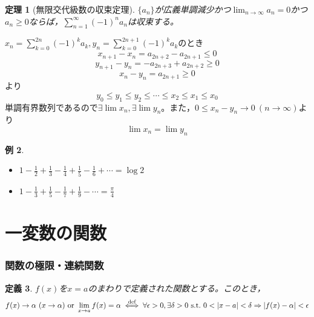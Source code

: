\documentclass[dvipdfmx,a4j,10pt]{jsarticle}
\makeatletter
\theoremstyle{mystyle1}
\newtheorem{dfn}{定義}[part]
\newtheorem{thm}[dfn]{定理}
\newtheorem{example}[dfn]{例}
\theoremstyle{mystyle2}
\renewenvironment{proof}[1][\proofname]{\par
  \pushQED{\qed}%
  \normalfont
  \topsep6\p@\@plus6\p@ \trivlist
  \item[\hskip\labelsep{\bfseries\sffamily #1}]\ignorespaces
}{%
  \popQED\endtrivlist\@endpefalse
}
\renewcommand\proofname{証明}
\newcommand{\defLeftrightarrow}{\overset{\text{def}}{\iff}}
\makeatother
\begin{document}
\newpage


\begin{framed}
    \begin{thm}[無限交代級数の収束定理]\label{thm4.10}
        $\{a_n\}$が広義単調減少かつ$\displaystyle\lim_{n\to\infty}a_n=0$かつ$a_n\geq0$ならば，$\displaystyle\sum_{n=1}^\infty (-1)^n a_n$は収束する。
    \end{thm}
\end{framed}

\begin{proof}[定理\ref{thm4.10}の証明]
$\displaystyle x_n=\sum_{k=0}^{2n}(-1)^ka_k,y_n=\sum_{k=0}^{2n+1}(-1)^ka_k$のとき
\[x_{n+1}-x_n=a_{2n+2}-a_{2n+1}\leq0\]
\[y_{n+1}-y_n=-a_{2n+3}+a_{2n+2}\geq0\]
\[x_n-y_n=a_{2n+1}\geq0\]
より
\[y_0\leq y_1\leq y_2\leq \cdots\leq x_2\leq x_1\leq x_0\]
単調有界数列であるので$\exists\lim x_n,\exists\lim y_n$。また，$0\leq x_n-y_n\to0\ (n\to\infty)$より
\[\lim x_n=\lim y_n\]
\end{proof}

\begin{example}\
    \begin{itemize}
        \item $\displaystyle 1-\frac{1}{2}+\frac{1}{3}-\frac{1}{4}+\frac{1}{5}-\frac{1}{6}+\cdots=\log{2}$
        \item $\displaystyle 1-\frac{1}{3}+\frac{1}{5}-\frac{1}{7}+\frac{1}{9}-\cdots=\frac{\pi}{4}$
    \end{itemize}
\end{example}


\newpage


\part{一変数の関数}
\section{関数の極限・連続関数}
\begin{framed}
\begin{dfn}
$f(x)$を$x=a$のまわりで定義された関数とする。このとき，
\[f(x)\to\alpha\ (x\to\alpha)\ {\rm or}\ \lim_{x\to a}f(x)=\alpha \defLeftrightarrow \forall\epsilon>0,\exists\delta>0\ {\rm s.t.}\ 0<|x-a|<\delta \Rightarrow |f(x)-\alpha|<\epsilon\]
\end{dfn}

\end{framed}
\end{document}
